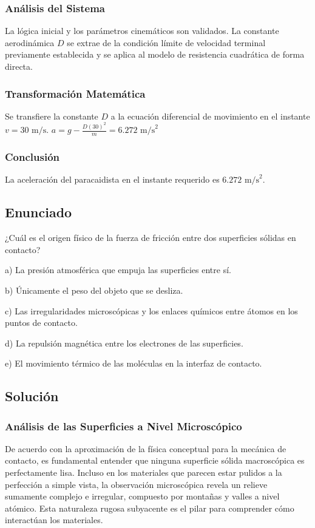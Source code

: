 \documentclass[12pt]{article}
\begin{document}
\subsubsection*{Análisis del Sistema}
La lógica inicial y los parámetros cinemáticos son validados. La constante aerodinámica $D$ se extrae de la condición límite de velocidad terminal previamente establecida y se aplica al modelo de resistencia cuadrática de forma directa.

\subsubsection*{Transformación Matemática}
Se transfiere la constante $D$ a la ecuación diferencial de movimiento en el instante $v = 30\text{ m/s}$.
$a = g - \frac{D(30)^2}{m} = 6.272\text{ m/s}^2$

\subsubsection*{Conclusión}
La aceleración del paracaidista en el instante requerido es $6.272\text{ m/s}^2$.

\newpage

\subsection*{Enunciado}
¿Cuál es el origen físico de la fuerza de fricción entre dos superficies sólidas en contacto?

a) La presión atmosférica que empuja las superficies entre sí.

b) Únicamente el peso del objeto que se desliza.

c) Las irregularidades microscópicas y los enlaces químicos entre átomos en los puntos de contacto.

d) La repulsión magnética entre los electrones de las superficies.

e) El movimiento térmico de las moléculas en la interfaz de contacto.

\subsection*{Solución}

\subsubsection*{Análisis de las Superficies a Nivel Microscópico}
De acuerdo con la aproximación de la física conceptual para la mecánica de contacto, es fundamental entender que ninguna superficie sólida macroscópica es perfectamente lisa. Incluso en los materiales que parecen estar pulidos a la perfección a simple vista, la observación microscópica revela un relieve sumamente complejo e irregular, compuesto por montañas y valles a nivel atómico. Esta naturaleza rugosa subyacente es el pilar para comprender cómo interactúan los materiales.
\end{document}
